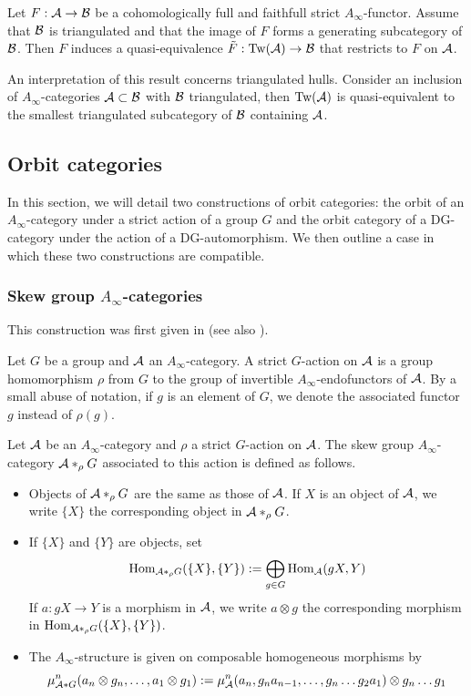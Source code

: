 \documentclass[12pt]{article}
\begin{document}
	\begin{lemma}{\cite[Lemma 3.34]{Sei}}
	\label{Seidel}
	Let $F: {\cal{A}} \to {\cal{B}}$ be a cohomologically full and faithfull strict $A_\infty$-functor. Assume that ${\cal{B}}$ is triangulated and that the image of $F$ forms a generating subcategory of ${\cal{B}}$. Then $F$ induces a quasi-equivalence $\tilde{F}: \textup{Tw}({\cal{A}}) \to {\cal{B}}$ that restricts to $F$ on ${\cal{A}}$.
	\end{lemma}
	
	An interpretation of this result concerns triangulated hulls. Consider an inclusion of $A_\infty$-categories ${\cal{A}} \subset {\cal{B}}$ with ${\cal{B}}$ triangulated, then $\textup{Tw}({\cal{A}})$ is quasi-equivalent to the smallest triangulated subcategory of ${\cal{B}}$ containing ${\cal{A}}$.
	
	\subsection{Orbit categories}
	
	In this section, we will detail two constructions of orbit categories: the orbit of an $A_\infty$-category under a strict action of a group $G$ and the orbit category of a DG-category under the action of a DG-automorphism. We then outline a case in which these two constructions are compatible.
	
	\subsubsection*{Skew group $A_\infty$-categories}
	
	This construction was first given in \cite[Definition~5.6]{OZ} (see also \cite[Section 2.4]{AP}).
	
	\noindent Let $G$ be a group and ${\cal{A}}$ an $A_\infty$-category. A strict $G$-action on ${\cal{A}}$ is a group homomorphism $\rho$ from $G$ to the group of invertible $A_\infty$-endofunctors of ${\cal{A}}$. By a small abuse of notation, if $g$ is an element of $G$, we denote the associated functor $g$ instead of $\rho(g)$. 
	
	\begin{definition}
		\label{Ainftyorbit}
		Let ${\cal{A}}$ be an $A_\infty$-category and $\rho$ a strict $G$-action on ${\cal{A}}$. The skew group $A_\infty$-category ${\cal{A}} *_\rho G$ associated to this action is defined as follows.
		\begin{itemize}
			\item Objects of ${\cal{A}} *_\rho G$ are the same as those of ${\cal{A}}$. If $X$ is an object of ${\cal{A}}$, we write $\{X\}$ the corresponding object in ${\cal{A}} *_\rho G$.
			\item If $\{X\}$ and $\{Y\}$ are objects, set 
			\[\textup{Hom}_{{\cal{A}} *_\rho G}(\{X\},\{Y\}):= \bigoplus_{g \in G} \textup{Hom}_{\cal{A}}(gX,Y)\]
			If $a: gX \to Y$ is a morphism in ${\cal{A}}$, we write $a \otimes g$ the corresponding morphism in $\textup{Hom}_{{\cal{A}} *_\rho G}(\{X\},\{Y\})$.
			\item The $A_\infty$-structure is given on composable homogeneous morphisms by
			\[\mu_{{\cal{A}} * G}^n(a_n \otimes g_n, \dots, a_1\otimes g_1):= \mu_{\cal{A}}^n(a_n, g_n a_{n-1}, \dots, g_n \dots g_2 a_1) \otimes g_n \dots g_1\]	
		\end{itemize}
	\end{definition}
	
\end{document}
